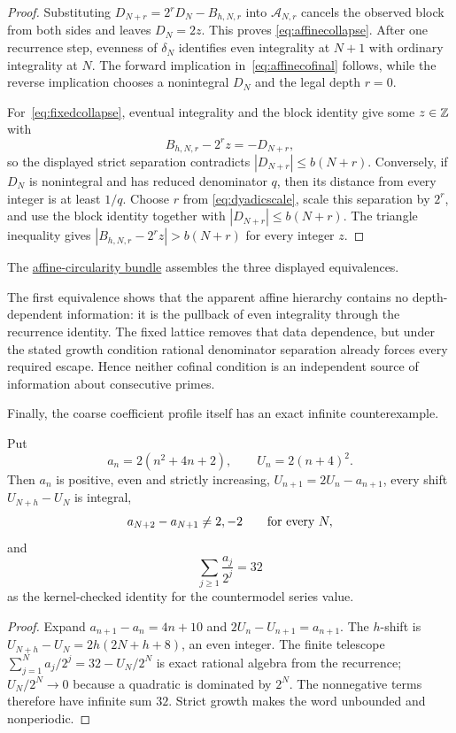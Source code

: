 \documentclass[11pt]{article}
\begin{document}
\begin{proof}
Substituting $D_{N+r}=2^rD_N-B_{h,N,r}$ into $\mathcal A_{N,r}$ cancels the
observed block from both sides and leaves $D_N=2z$.  This proves
\eqref{eq:affinecollapse}.  After one recurrence step, evenness of
$\delta_N$ identifies even integrality at $N+1$ with ordinary integrality at
$N$.  The forward implication in~\eqref{eq:affinecofinal} follows, while the
reverse implication chooses a nonintegral $D_N$ and the legal depth $r=0$.

For~\eqref{eq:fixedcollapse}, eventual integrality and the block identity give
some $z\in\mathbb{Z}$ with
\[
 B_{h,N,r}-2^rz=-D_{N+r},
\]
so the displayed strict separation contradicts $|D_{N+r}|\le b(N+r)$.
Conversely, if $D_N$ is nonintegral and has reduced denominator $q$, then its
distance from every integer is at least $1/q$.  Choose $r$ from
\eqref{eq:dyadicscale}, scale this separation by $2^r$, and use the block
identity together with $|D_{N+r}|\le b(N+r)$.  The triangle inequality gives
$|B_{h,N,r}-2^rz|>b(N+r)$ for every integer $z$.
\end{proof}

\noindent The \href{https://github.com/wcook04/plectis-erdos/blob/f36a98bf3d3e6f65f1074e3b800e3293d5b8a51a/ErdosProblems/Erdos251/PaperCoreR7.lean#L241}{affine-circularity bundle}
assembles the three displayed equivalences.

The first equivalence shows that the apparent affine hierarchy contains no
depth-dependent information: it is the pullback of even integrality through
the recurrence identity.  The fixed lattice removes that data dependence, but
under the stated growth condition rational denominator separation already
forces every required escape.  Hence neither cofinal condition is an
independent source of information about consecutive primes.

Finally, the coarse coefficient profile itself has an exact infinite
counterexample.

\begin{proposition}\label{res:polynomialcountermodel}
Put
\[
 a_n=2(n^2+4n+2),\qquad U_n=2(n+4)^2.
\]
Then $a_n$ is positive, even and strictly increasing,
$U_{n+1}=2U_n-a_{n+1}$, every shift $U_{N+h}-U_N$ is integral,
\[
 a_{N+2}-a_{N+1}\ne2,-2
 \qquad\hbox{for every }N,
\]
and
\[
 \sum_{j\ge1}\frac{a_j}{2^j}=32
\]
as the kernel-checked identity for the countermodel series value.
\end{proposition}

\begin{proof}
Expand $a_{n+1}-a_n=4n+10$ and $2U_n-U_{n+1}=a_{n+1}$.  The $h$-shift is
$U_{N+h}-U_N=2h(2N+h+8)$, an even integer.  The finite telescope
$\sum_{j=1}^{N}a_j/2^j=32-U_N/2^N$ is exact rational algebra from the
recurrence; $U_N/2^N\to0$ because a quadratic is dominated by $2^N$.  The
nonnegative terms therefore have infinite sum $32$.  Strict growth makes the
word unbounded and nonperiodic.
\end{proof}
\end{document}
